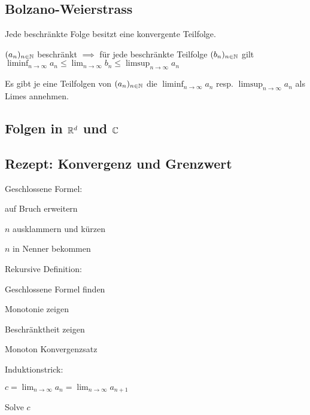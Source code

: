 \subsection{Bolzano-Weierstrass}
Jede beschränkte Folge besitzt eine konvergente Teilfolge.
\begin{compactitem}
    \item $(a_n)_{n \in \mathbb{N}}$ beschränkt $\implies$ für jede beschränkte Teilfolge $(b_n)_{n \in \mathbb{N}}$ gilt $\liminf_{n \to \infty} a_n \le \lim_{n \to \infty} b_n \le  \limsup_{n \to \infty} a_n$
    \item Es gibt je eine Teilfolgen von $(a_n)_{n \in \mathbb{N}}$ die $\liminf_{n \to \infty} a_n$ resp. $\limsup_{n \to \infty} a_n$ als Limes annehmen.
\end{compactitem}

\subsection{Folgen in $\mathbb{R}^{d}$ und $\mathbb{C}$}

\subsection{Rezept: Konvergenz und Grenzwert}
\begin{compactdesc}
    \item[Geschlossene Formel:]
        \begin{inparaitem}
            \item auf Bruch erweitern
            \item $n$ ausklammern und kürzen
            \item $n$ in Nenner bekommen
        \end{inparaitem}
    \item[Rekursive Definition:]
        \begin{inparaitem}
            \item Geschlossene Formel finden
            \item
                \begin{inparaenum}
                    \item Monotonie zeigen
                    \item Beschränktheit zeigen
                    \item Monoton Konvergenzsatz
                    \item Induktionstrick:
                        \begin{inparaitem}
                            \item $c = \lim_{n \to \infty} a_n = \lim_{n \to \infty} a_{n+1}$
                            \item Solve $c$
                        \end{inparaitem}
                \end{inparaenum}
        \end{inparaitem}
\end{compactdesc}

